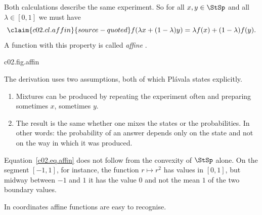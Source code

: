Both calculations describe the same experiment. So for all $x, y \in \StSp$ and all
$\lambda \in [0,1]$ we must have
\begin{equation}\label{c02.eq.affin}\claim{c02.cl.affin}{source-quoted}
  f(\lambda x + (1-\lambda) y) = \lambda f(x) + (1-\lambda) f(y) .
\end{equation}
A function with this property is called \emph{affine}
.

\begin{tpcfigure}{c02.fig.affin}
  \caption{Mixing the states or mixing the probabilities. Horizontally the segment between two states is plotted, vertically the probability of yes. (a) An affine function: its graph is a straight line. In the mixture $z = \tfrac14 x + \tfrac34 y$ it has the value $\tfrac14\cdot\tfrac14 + \tfrac34\cdot\tfrac34 = \tfrac58$, the same mixture of the two end values. (b) The function $r \mapsto r^2$ on $[-1,1]$: the mean of the end values is $1$, the value in the middle is $0$. Such a function cannot describe a yes-no question.}
\end{tpcfigure}

\begin{greybox}
  The derivation uses two assumptions, both of which Plávala states explicitly.
  \begin{enumerate}
    \item Mixtures can be produced by repeating the experiment often and preparing
      sometimes $x$, sometimes $y$.
    \item The result is the same whether one mixes the states or the probabilities. In
      other words: the probability of an answer depends only on the state and not on the
      way in which it was produced.
  \end{enumerate}
  Equation~\eqref{c02.eq.affin} does not follow from the convexity of $\StSp$ alone. On
  the segment $[-1,1]$, for instance, the function $r \mapsto r^2$ has values in $[0,1]$,
  but midway between $-1$ and $1$ it has the value $0$ and not the mean $1$ of the two
  boundary values.
\end{greybox}


In coordinates affine functions are easy to recognise.

